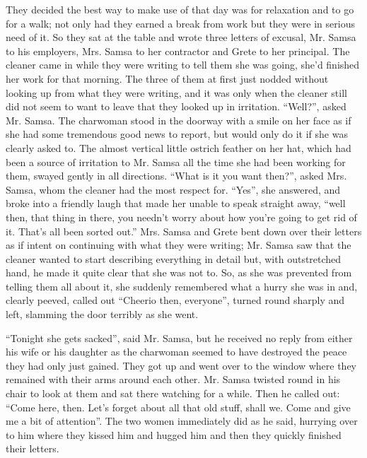 They decided the best way to make use of that day was for relaxation
and to go for a walk; not only had they earned a break from work but
they were in serious need of it. So they sat at the table and wrote
three letters of excusal, Mr. Samsa to his employers, Mrs. Samsa to her
contractor and Grete to her principal. The cleaner came in while they
were writing to tell them she was going, she’d finished her work for
that morning. The three of them at first just nodded without looking up
from what they were writing, and it was only when the cleaner still did
not seem to want to leave that they looked up in irritation. “Well?”,
asked Mr. Samsa. The charwoman stood in the doorway with a smile on her
face as if she had some tremendous good news to report, but would only
do it if she was clearly asked to. The almost vertical little ostrich
feather on her hat, which had been a source of irritation to Mr. Samsa
all the time she had been working for them, swayed gently in all
directions. “What is it you want then?”, asked Mrs. Samsa, whom the
cleaner had the most respect for. “Yes”, she answered, and broke into a
friendly laugh that made her unable to speak straight away, “well then,
that thing in there, you needn’t worry about how you’re going to get
rid of it. That’s all been sorted out.” Mrs. Samsa and Grete bent down
over their letters as if intent on continuing with what they were
writing; Mr. Samsa saw that the cleaner wanted to start describing
everything in detail but, with outstretched hand, he made it quite
clear that she was not to. So, as she was prevented from telling them
all about it, she suddenly remembered what a hurry she was in and,
clearly peeved, called out “Cheerio then, everyone”, turned round
sharply and left, slamming the door terribly as she went.

“Tonight she gets sacked”, said Mr. Samsa, but he received no reply
from either his wife or his daughter as the charwoman seemed to have
destroyed the peace they had only just gained. They got up and went
over to the window where they remained with their arms around each
other. Mr. Samsa twisted round in his chair to look at them and sat
there watching for a while. Then he called out: “Come here, then. Let’s
forget about all that old stuff, shall we. Come and give me a bit of
attention”. The two women immediately did as he said, hurrying over to
him where they kissed him and hugged him and then they quickly finished
their letters.

